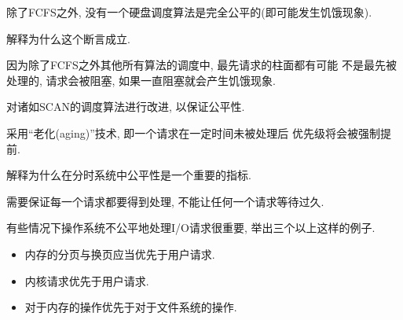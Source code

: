 \begin{problem}
    除了FCFS之外, 没有一个硬盘调度算法是完全公平的(即可能发生饥饿现象).
    \begin{question}
        解释为什么这个断言成立.
    \begin{answer}
        因为除了FCFS之外其他所有算法的调度中, 最先请求的柱面都有可能
        不是最先被处理的, 请求会被阻塞, 如果一直阻塞就会产生饥饿现象.
    \end{answer}
    \end{question}

    \begin{question}
        对诸如SCAN的调度算法进行改进, 以保证公平性.
        \begin{answer}
            采用``老化(aging)''技术, 即一个请求在一定时间未被处理后
            优先级将会被强制提前.
        \end{answer}
    \end{question}

    \begin{question}
        解释为什么在分时系统中公平性是一个重要的指标.
        \begin{answer}
            需要保证每一个请求都要得到处理, 不能让任何一个请求等待过久.
        \end{answer}
    \end{question}

    \begin{question}
        有些情况下操作系统不公平地处理I/O请求很重要, 举出三个以上这样的例子.
        \begin{answer}
            \begin{itemize}
                \item 内存的分页与换页应当优先于用户请求.
                \item 内核请求优先于用户请求.
                \item 对于内存的操作优先于对于文件系统的操作.
            \end{itemize}
        \end{answer}
    \end{question}
\end{problem}


